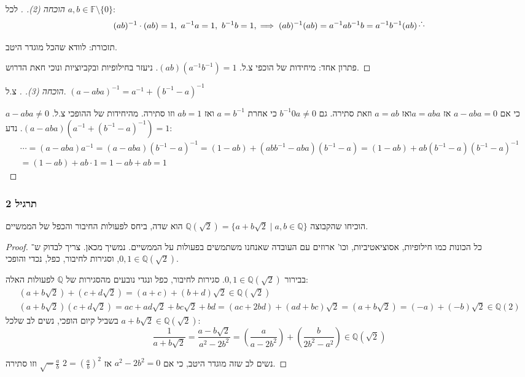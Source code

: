\documentclass[]{article}
\newcommand\Q     {\mathbb{Q}}
\newcommand\F     {\mathbb{F}}
\newcommand\op    {^{-1}}
\newcommand\cl [1]    {\left ( #1 \right )}
\begin{document}
	\begin{proof}[הוכחה (2). ]
		לכל $a, b \in \F\setminus \{0\}$: 
		\[ (ab)\op \cdot (ab) = 1, \ a\op a = 1, \ b\op b = 1, \implies (ab)\op(ab) = a\op a b\op b = a\op b\op (ab) \rotatebox{60}{$\because$} \]
		
		תזכורת: לוודא שהכל מוגדר היטב. 
		
		פתרון אחד: מיחידות של הוכפי צ.ל. $(ab)(a\op b\op) = 1$. ניעזר בחילופיות ובקביוציות ונוכי חאת הדרוש. 
	\end{proof}
	
	\begin{proof}[הוכחה (3). ]צ.ל. $(a - aba)\op = a\op + (b\op -a)\op$
		
		$a - aba \neq 0$  כי אם $a - aba = 0$ אז $a = aba $ואז $a = ab$ וזאת סתירה. גם $b\op 0 a \neq 0$ כי אחרת $a = b\op$ ואז $ab = 1$ וזו סתירה. 
		מהיחידות של ההופכי צ.ל. $(a - aba)(a\op + (b\op - a)\op) = 1$. נדע: 
		\begin{multline*}
			\cdots = (a - aba)a\op = (a - aba)(b\op - a)\op = (1 - ab) + (abb\op - aba) (b\op - a) = (1 - ab) + ab(b\op - a)(b\op - a)\op \\
			= (1 - ab) + ab \cdot 1 = 1 - ab + ab = 1
		\end{multline*}
	\end{proof}
	
	\subsubsection{תרגיל 2}
	הוכיחו שהקבוצה $\Q(\sqrt2) = \{a + b \sqrt 2 \mid a, b \in \Q\}$ הוא שדה, ביחס לפעולות החיבור והכפל של הממשיים. 
	
	\begin{proof}
		כל הכונות כמו חילופיות, אסוציאטיביות, וכו' ארוזים עם העובדה שאנחנו משתמשים בפעולות על הממשיים. נמשיך מכאן. צריך לבדוק ש־$0, 1 \in \Q(\sqrt2)$, וסגירות לחיבור, כפל, נכדי והופכי. 
		
		בבירור $0, 1 \in \Q(\sqrt 2)$. סגירות לחיבור, כפל ונגדי נובעים מהסגירות של $\Q$ לפעולות האלה: 
		\begin{gather}
			(a + b\sqrt2)  + (c + d\sqrt2) = (a + c) + (b + d)\sqrt2 \in \Q(\sqrt 2) \\
			(a + b\sqrt2)(c + d\sqrt2) = ac + ad\sqrt2 + bc\sqrt 2 + bd = (ac + 2bd) + (ad + bc)\sqrt2 = (a + b\sqrt2) = (-a) + (-b)\sqrt2 \in \Q(2)
		\end{gather}
		בשביל קיום הופכי, נשים לב שלכל $a + b \sqrt 2 \in \Q(\sqrt 2)$: 
		\[ \frac{1}{a + b\sqrt2} = \frac{a - b\sqrt 2}{a^2 - 2b^2} = \cl{\frac{a}{a - 2b^2}} + \cl{\frac{b}{2b^2 - a^2}} \in \Q(\sqrt 2) \]
		
		נשים לב שזה מוגדר היטב, כי אם $a^2 - 2b^2 = 0$ אז $2 = \cl{\frac{a}{b}}^2$  $\sqrt = \frac{a}{b}$ וזו סתירה. 
	\end{proof}
	
\end{document}
